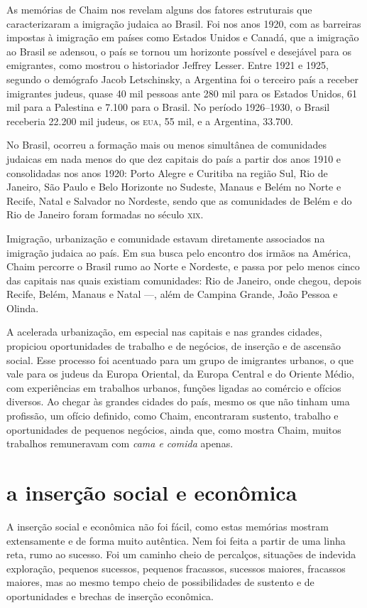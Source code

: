 As memórias de Chaim nos revelam alguns dos fatores estruturais que
caracterizaram a imigração judaica ao Brasil. Foi nos anos 1920, com as
barreiras impostas à imigração em países como Estados Unidos e Canadá,
que a imigração ao Brasil se adensou, o país se tornou um horizonte
possível e desejável para os emigrantes, como mostrou o historiador
Jeffrey Lesser. Entre 1921 e 1925, segundo o demógrafo Jacob
Letschinsky, a Argentina foi o terceiro país a receber imigrantes
judeus, quase 40 mil pessoas ante 280 mil para os Estados Unidos, 61 mil
para a Palestina e 7.100 para o Brasil. No período 1926--1930, o Brasil
receberia 22.200 mil judeus, os \textsc{eua}, 55 mil, e a Argentina, 33.700.

No Brasil, ocorreu a formação mais ou menos simultânea de comunidades
judaicas em nada menos do que dez capitais do país a partir dos anos
1910 e consolidadas nos anos 1920: Porto Alegre e Curitiba na região
Sul, Rio de Janeiro, São Paulo e Belo Horizonte no Sudeste, Manaus e
Belém no Norte e Recife, Natal e Salvador no Nordeste, sendo que as
comunidades de Belém e do Rio de Janeiro foram formadas no século \textsc{xix}.

Imigração, urbanização e comunidade estavam diretamente associados na 
imigração judaica ao país. Em sua busca pelo encontro dos
irmãos na América, Chaim percorre o Brasil rumo ao Norte e Nordeste, e passa por pelo menos cinco das capitais nas quais existiam 
comunidades: Rio de Janeiro, onde chegou, depois Recife, Belém, Manaus e
Natal ---, além de Campina Grande, João Pessoa e Olinda.

A acelerada urbanização, em especial nas capitais e nas grandes cidades,
propiciou oportunidades de trabalho e de negócios, de inserção e de
ascensão social. Esse processo foi acentuado para um grupo de imigrantes
urbanos, o que vale para os judeus da Europa Oriental, da Europa Central
e do Oriente Médio, com experiências em trabalhos urbanos, funções
ligadas ao comércio e ofícios diversos. Ao chegar às grandes cidades do
país, mesmo os que não tinham uma profissão, um ofício definido, como
Chaim, encontraram sustento, trabalho e oportunidades de pequenos
negócios, ainda que, como mostra Chaim, muitos trabalhos remuneravam com
\textit{cama e comida} apenas.

\section{a inserção social e econômica}

A inserção social e econômica não foi fácil, como estas memórias
mostram extensamente e de forma muito autêntica. Nem foi feita a partir de uma linha
reta, rumo ao sucesso. Foi um caminho cheio de percalços, situações de
indevida exploração, pequenos sucessos, pequenos fracassos, sucessos
maiores, fracassos maiores, mas ao mesmo tempo cheio de possibilidades
de sustento e de oportunidades e brechas de inserção econômica. 

